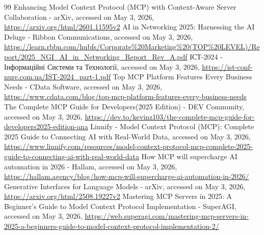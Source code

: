 \documentclass[12pt, a4paper]{report}
\begin{document}
\begin{thebibliography}{99}
 Enhancing Model Context Protocol (MCP) with Context-Aware Server Collaboration - arXiv, accessed on May 3, 2026, \url{https://arxiv.org/html/2601.11595v2}
 AI in Networking 2025: Harnessing the AI Deluge - Ribbon Communications, accessed on May 3, 2026, \url{https://learn.rbbn.com/hubfs/Corporate\%20Marketing\%20(TOP\%20LEVEL)/Report/2025_NGI_AI_in_Networking_Report_Rev_A.pdf}
 ІСТ-2024 - Інформаційні Системи та Технології, accessed on May 3, 2026, \url{https://ist-conf-nure.com.ua/IST-2024_part-1.pdf}
 Top MCP Platform Features Every Business Needs - CData Software, accessed on May 3, 2026, \url{https://www.cdata.com/blog/top-mcp-platform-features-every-business-needs}
 The Complete MCP Guide for Developers(2025 Edition) - DEV Community, accessed on May 3, 2026, \url{https://dev.to/kevinz103/the-complete-mcp-guide-for-developers2025-edition-ana}
 Linnify - Model Context Protocol (MCP): Complete 2025 Guide to Connecting AI with Real-World Data, accessed on May 3, 2026, \url{https://www.linnify.com/resources/model-context-protocol-mcp-complete-2025-guide-to-connecting-ai-with-real-world-data}
 How MCP will supercharge AI automation in 2026 - Hallam, accessed on May 3, 2026, \url{https://hallam.agency/blog/how-mcp-will-supercharge-ai-automation-in-2026/}
 Generative Interfaces for Language Models - arXiv, accessed on May 3, 2026, \url{https://arxiv.org/html/2508.19227v2}
 Mastering MCP Servers in 2025: A Beginner's Guide to Model Context Protocol Implementation - SuperAGI, accessed on May 3, 2026, \url{https://web.superagi.com/mastering-mcp-servers-in-2025-a-beginners-guide-to-model-context-protocol-implementation-2/}

\end{thebibliography}
\end{document}
